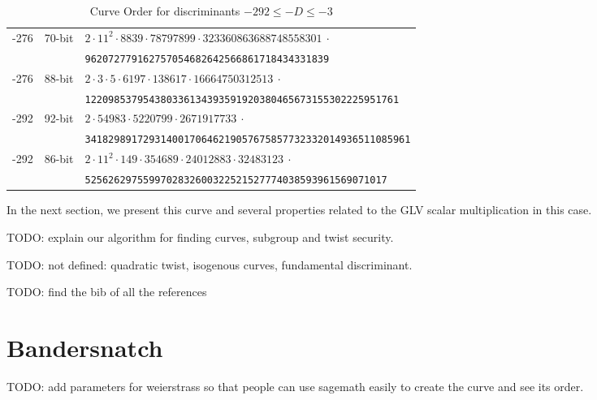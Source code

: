 \documentclass{amsart}
\newcommand{\SM}[1]{\color{blue}#1\color{black}}
\begin{document}
\begin{table*}[ht]
\begin{tabularx}{\textwidth}{ccl}
       	 -276 &  70-bit & \tt $  2 \cdot 11^2 \cdot 8839 \cdot 78797899 \cdot 323360863688748558301 ~\cdot  $  \\
         			&   & \tt   962072779162757054682642566861718434331839\\  	
       	 -276 &  88-bit & \tt $  2 \cdot 3 \cdot 5 \cdot 6197 \cdot 138617 \cdot 16664750312513 ~\cdot  $  \\
         			&   & \tt  122098537954380336134393591920380465673155302225951761\\  	
       	 -292 &  92-bit & \tt $  2 \cdot  54983 \cdot  5220799 \cdot  2671917733 ~\cdot  $  \\
         			&   & \tt   34182989172931400170646219057675857732332014936511085961\\  	
       	 -292 &  86-bit & \tt $  2 \cdot 11^2 \cdot 149 \cdot 354689 \cdot 24012883 \cdot 32483123 ~\cdot  $  \\
         			&   & \tt  5256262975599702832600322521527774038593961569071017\\  	
        \bottomrule
    \end{tabularx}
    \caption{Curve Order for discriminants $-292 \leq -D \leq -3$ }
    \label{tab:group-order-factorization}
\end{table*}

In the next section, we present this curve and several properties
related to the  GLV scalar multiplication in this case.

\SM{TODO: explain our algorithm for finding curves, subgroup and twist
  security.}

\SM{TODO: not defined: quadratic twist, isogenous curves, fundamental
  discriminant.}

\SM{TODO: find the bib of all the references}

\section{Bandersnatch} 

\SM{TODO: add parameters for weierstrass so that people can use sagemath
  easily to create the curve and see its order.}
\end{document}
